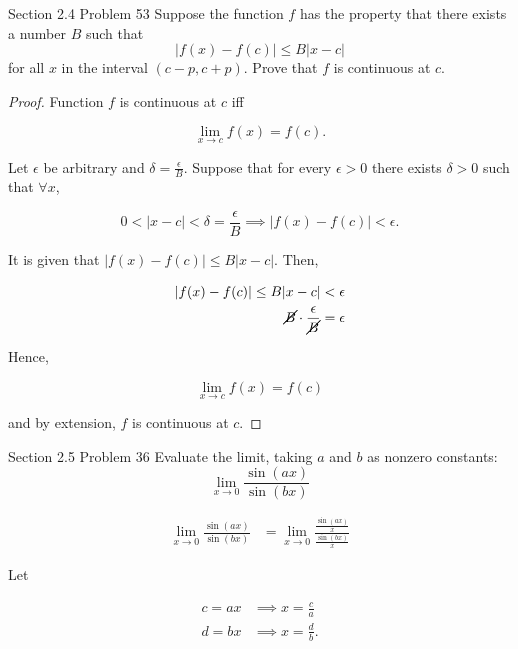 \documentclass{article}
\begin{document}
    \begin{tbhtheorem}{Section 2.4 Problem 53}
        Suppose the function $f$ has the property that there exists a number $B$ such that
        \[
            |f(x) - f(c) | \leq B|x-c|
        \]
       for all $x$ in the interval $(c-p, c+p)$. Prove that $f$ is continuous at $c$.
    \end{tbhtheorem}

    \begin{proof}
        Function $f$ is continuous at $c$ iff

        \[
            \lim_{x\to c} f(x) = f(c).
        \]

        Let $\epsilon$ be arbitrary and $\delta = \frac{\epsilon}{B}$. Suppose that for every $\epsilon > 0$ there exists $\delta > 0$ such that $\forall x$,

        \[
            0 < |x - c| < \delta = \frac{\epsilon}{B} \implies |f(x) - f(c)| < \epsilon.
        \]

        It is given that $|f(x) - f(c)| \leq B|x-c|$. Then,

        \begin{align*}
            |f(x) - f(c)| \leq B|x-c|                    &< \epsilon \\
            \cancel{B} \cdot \frac{\epsilon}{\cancel{B}} &= \epsilon
        \end{align*}

        \pagebreak

        Hence,

        \[
            \lim_{x\to c} f(x) = f(c)
        \]

        and by extension, $f$ is continuous at $c$.
    \end{proof}

    \thispagestyle{page5}

    \begin{tbhtheorem}{Section 2.5 Problem 36}
        Evaluate the limit, taking $a$ and $b$ as nonzero constants:
        \[
            \lim_{x\to 0} \frac{\sin{(ax)}}{\sin{(bx)}}
        \]
    \end{tbhtheorem}

    \begin{align*}
        \lim_{x\to 0} \frac{\sin{(ax)}}{\sin{(bx)}} &= \lim_{x\to 0} \frac{\frac{\sin{(ax)}}{x}}{\frac{\sin{(bx)}}{x}}
    \end{align*}

    Let

    \begin{align*}
        c = ax  & \implies x = \frac{c}{a} \\
        d = bx  & \implies x = \frac{d}{b}.
    \end{align*}
\end{document}

